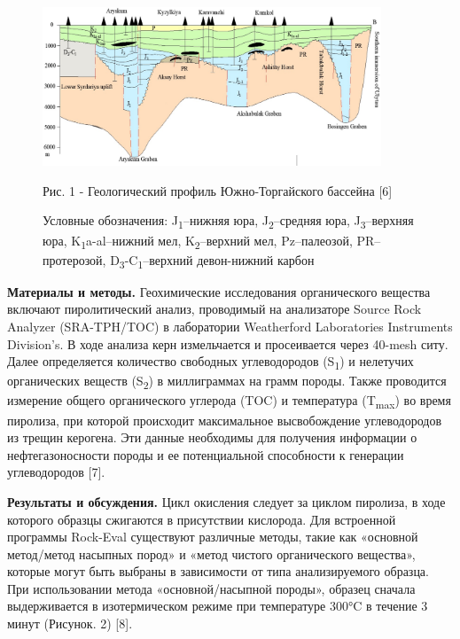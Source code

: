 \begin{figure}[H]
	\centering
	\includegraphics[width=0.9\textwidth]{assets/1258}
	\caption*{Рис. 1 - Геологический профиль Южно-Торгайского бассейна {[}6{]}}
	\caption*{Условные обозначения: J\textsubscript{1}--нижняя юра, J\textsubscript{2}--средняя юра, J\textsubscript{3}--верхняя юра, K\textsubscript{1}a-al--нижний мел, K\textsubscript{2}--верхний мел, Pz--палеозой, PR--протерозой, D\textsubscript{3}-C\textsubscript{1}--верхний девон-нижний карбон}
\end{figure}

\begin{multicols}{2}
{\bfseries Материалы и методы.} Геохимические исследования органического
вещества включают пиролитический анализ, проводимый на анализаторе
Source Rock Analyzer (SRA-TPH/TOC) в лаборатории Weatherford
Laboratories Instruments Division's. В ходе анализа керн измельчается и
просеивается через 40-mesh ситу. Далее определяется количество свободных
углеводородов (S\textsubscript{1}) и нелетучих органических веществ
(S\textsubscript{2}) в миллиграммах на грамм породы. Также проводится
измерение общего органического углерода (TOC) и температура
(T\textsubscript{max}) во время пиролиза, при которой происходит
максимальное высвобождение углеводородов из трещин керогена. Эти данные
необходимы для получения информации о нефтегазоносности породы и ее
потенциальной способности к генерации углеводородов {[}7{]}.

{\bfseries Результаты и обсуждения.} Цикл окисления следует за циклом
пиролиза, в ходе которого образцы сжигаются в присутствии кислорода. Для
встроенной программы Rock-Eval существуют различные методы, такие как
«основной метод/метод насыпных пород» и «метод чистого органического
вещества», которые могут быть выбраны в зависимости от типа
анализируемого образца. При использовании метода «основной/насыпной
породы», образец сначала выдерживается в изотермическом режиме при
температуре 300°C в течение 3 минут (Рисунок. 2) {[}8{]}.
\end{multicols}

